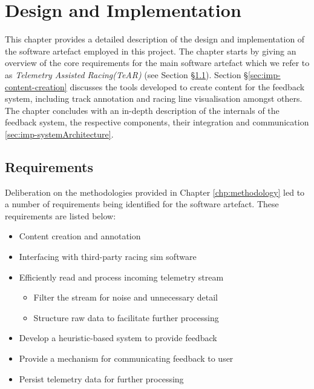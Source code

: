 \def \methodname {TeAR\xspace}
\def \methodnamefull {Telemetry Assisted Racing\xspace}

\chapter{Design and Implementation}
\label{chp:design-implementation}
This chapter provides a detailed description of the design and implementation of the software artefact employed in this project. The chapter starts by giving an overview of the core requirements for the main software artefact which we refer to as \emph{\methodnamefull (\methodname)} (see Section \S\ref{sec:imp-requirements}). Section \S\ref{sec:imp-content-creation} discusses the tools developed to create content for the feedback system, including track annotation and racing line visualisation amongst others. The chapter concludes with an in-depth description of the internals of the feedback system, the respective components, their integration and communication \ref{sec:imp-systemArchitecture}.

\section{Requirements}
\label{sec:imp-requirements}
Deliberation on the methodologies provided in Chapter \ref{chp:methodology} led to a number of requirements being identified for the software artefact. These requirements are listed below:

\begin{itemize}
	\item Content creation and annotation 
	\item Interfacing with third-party racing sim software 
	\item Efficiently read and process incoming telemetry stream
	\begin{itemize}
		\item Filter the stream for noise and unnecessary detail
		\item Structure raw data to facilitate further processing
	\end{itemize}
	\item Develop a heuristic-based system to provide feedback
	\item Provide a mechanism for communicating feedback to user
	\item Persist telemetry data for further processing
\end{itemize}

